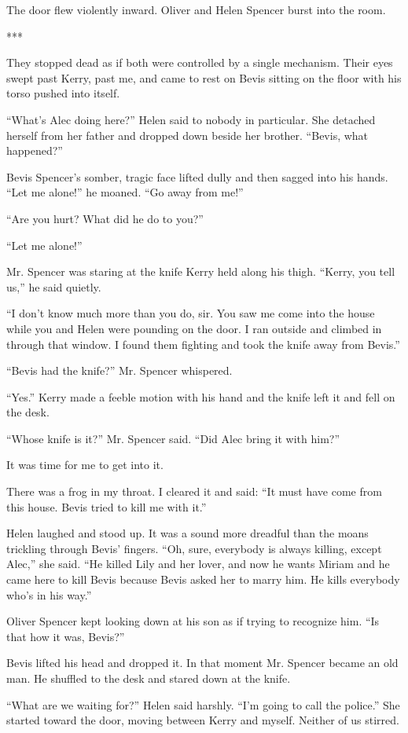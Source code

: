 \documentclass{novel}
\begin{document}
{The door flew violently inward. Oliver and Helen Spencer burst into the room.

***

They stopped dead as if both were controlled by a single mechanism. Their eyes swept past Kerry, past me, and came to rest on Bevis sitting on the floor with his torso pushed into itself.

“What’s Alec doing here?” Helen said to nobody in particular. She detached herself from her father and dropped down beside her brother. “Bevis, what happened?”

Bevis Spencer’s somber, tragic face lifted dully and then sagged into his hands. “Let me alone!” he moaned. “Go away from me!”

“Are you hurt? What did he do to you?”

“Let me alone!”

Mr. Spencer was staring at the knife Kerry held along his thigh. “Kerry, you tell us,” he said quietly.

“I don’t know much more than you do, sir. You saw me come into the house while you and Helen were pounding on the door. I ran outside and climbed in through that window. I found them fighting and took the knife away from Bevis.”

“Bevis had the knife?” Mr. Spencer whispered.

“Yes.” Kerry made a feeble motion with his hand and the knife left it and fell on the desk.

“Whose knife is it?” Mr. Spencer said. “Did Alec bring it with him?”

It was time for me to get into it.

There was a frog in my throat. I cleared it and said: “It must have come from this house. Bevis tried to kill me with it.”

Helen laughed and stood up. It was a sound more dreadful than the moans trickling through Bevis’ fingers. “Oh, sure, everybody is always killing, except Alec,” she said. “He killed Lily and her lover, and now he wants Miriam and he came here to kill Bevis because Bevis asked her to marry him. He kills everybody who’s in his way.”

Oliver Spencer kept looking down at his son as if trying to recognize him. “Is that how it was, Bevis?”

Bevis lifted his head and dropped it. In that moment Mr. Spencer became an old man. He shuffled to the desk and stared down at the knife.

“What are we waiting for?” Helen said harshly. “I’m going to call the police.” She started toward the door, moving between Kerry and myself. Neither of us stirred.

}
\end{document}

